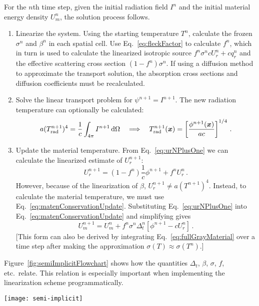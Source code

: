 For the $n$th time step, given the initial radiation field $I^{n}$ and the
initial material energy density $U_m^n$, the solution process follows.
\begin{enumerate}
  \item Linearize the system. Using the starting temperature $T^n$, calculate
    the frozen $\sigma^n$ and $\beta^n$ in each spatial cell. Use
    Eq.~\eqref{eq:fleckFactor} to calculate $f^n$, which in turn is used to
    calculate the linearized isotropic source $f^n \sigma^n c U_r^n + c q_r^n$
    and the effective scattering cross section $\left(1 - f^n\right) \sigma^n$.
    If using a diffusion method to approximate the transport solution, the
    absorption cross sections and diffusion coefficients must be recalculated.
  \item Solve the linear transport problem for $\psi^{n+1}=I^{n+1}$. The new
    radiation
    temperature can optionally be calculated:
    \begin{equation*}
      a (T_\text{rad}^{n+1})^4 = \frac{1}{c} \int_{4\pi} I^{n+1}
      \mathop{}\!\mathrm{d} \Omega
      \quad \Longrightarrow \quad
      T_\text{rad}^{n+1}(\bm{x}) = \left[ \frac{\phi^{n+1}(\bm{x})}{ac} \right]^{1/4}\,.
    \end{equation*}
  \item Update the material temperature. From Eq.~\eqref{eq:urNPlusOne}
    we can calculate the linearized estimate of $U_r^{n+1}$:
    \begin{equation*}
      U_r^{n+1} = \left(1 - f^n\right) \frac1c \phi^{n+1}  + f^n U_r^n\,.
    \end{equation*}
    However, because of the linearization of $\beta$, $U_r^{n+1} \ne a
    (T^{n+1})^4$. Instead, to calculate the material temperature, we must use
    Eq.~\eqref{eq:matenConservationUpdate}. Substituting
    Eq.~\eqref{eq:urNPlusOne} into Eq.~\eqref{eq:matenConservationUpdate}
    and simplifying gives
    \begin{equation}\label{eq:matenConservationUpdate2}
      U_m^{n+1} =  U_m^n + f^n \sigma^n \Delta_t^n \left[ \phi^{n+1} - c U_r^n \right] \,.
    \end{equation}
    [This form can also be derived by integrating
    Eq.~\eqref{eq:fullGrayMaterial} over a time step after making the
    approximation $\sigma(T) \approx \sigma(T^n)$.]
\end{enumerate}

Figure~\ref{fig:semiImplicitFlowchart} shows how the quantities $\Delta_t$,
$\beta$, $\sigma$, $f$, etc.~relate. This relation is especially important when
implementing the linearization scheme programmatically. 
\begin{sidewaysfigure}[hp]
  \centering
  \texttt{[image: semi-implicit]}
  \caption{Dependency graph of quantities in the semi-implicit discretization.}
  \label{fig:semiImplicitFlowchart}
\end{sidewaysfigure}

